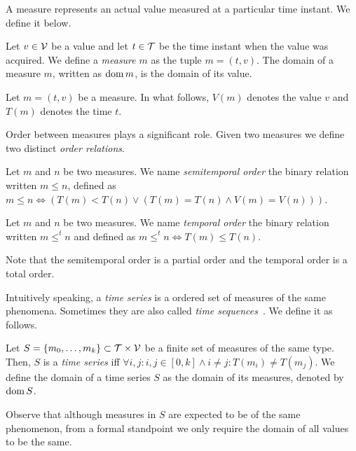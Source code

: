 A measure represents an actual value measured at a particular time
instant. We define it below.

\begin{definition}[Measure]
  Let $v\in\cal{V}$ be a value and let $t\in\cal{T}$ be the time
  instant when the value was acquired. We define a \emph{measure} $m$
  as the tuple $m=(t,v)$. The domain of a measure $m$, written as
  $\operatorname{dom} m$, is the domain of its value.
\end{definition}

Let $m = (t,v)$ be a measure. In what follows, $V(m)$ denotes the
value $v$ and $T(m)$ denotes the time $t$.

Order between measures plays a significant role. Given two measures we
define two distinct \emph{order relations}.

\begin{definition}\label{def:semitemporal_order}
  Let $m$ and $n$ be two measures. We name \emph{semitemporal order}
  the binary relation written $m\leq n$, defined as $m\leq n\iff
  (T(m)<T(n) \vee ( T(m)=T(n) \wedge V(m) = V(n) ))$.
\end{definition}

\begin{definition}\label{def:temporal_order}
  Let $m$ and $n$ be two measures. We name \emph{temporal order} the
  binary relation written $m \leq^t n$ and defined as $m \leq^t n \iff
  T(m) \leq T(n)$.
\end{definition}

Note that the semitemporal order is a partial order and the temporal
order is a total order.


Intuitively speaking, a \emph{time series} is a ordered set of
measures of the same phenomena.  Sometimes they are also called
\emph{time sequences}~\cite{last:hetland}. We define it as follows.

\begin{definition}
  \label{def:model:timeseries}
  Let $S = \{m_0,\ldots,m_k\}\subset\cal{T}\times\cal{V}$ be a finite
  set of measures of the same type. Then, $S$ is a \emph{time series}
  iff $\forall i,j: i,j\in[0,k] \wedge i\neq j: T(m_i)\neq T(m_j)$. We
  define the domain of a time series $S$ as the domain of its
  measures, denoted by $\operatorname{dom} S$.
\end{definition}

Observe that although measures in $S$ are expected to be of the same
phenomenon, from a formal standpoint we only require the domain of all
values to be the same.

